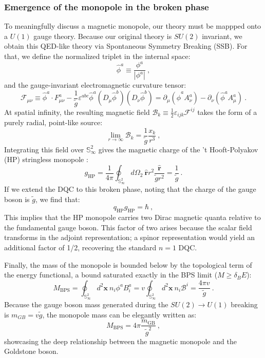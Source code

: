 \documentclass[a4paper,11pt]{article}
\begin{document}
\subsubsection{Emergence of the monopole in the broken phase}
To meaningfully discuss a magnetic monopole, our theory must be mappped onto a $U(1)$ gauge theory. Because our original theory is $SU(2)$ invariant, we obtain this QED-like theory via Spontaneous Symmetry Breaking (SSB). For that, we define the normalized triplet in the internal space:
\begin{equation}
    \hat \phi^a\equiv \frac{\phi^a}{|\phi^a|}\ ,
\end{equation}
and the gauge-invariant electromagnetic curvature tensor:
\begin{equation}
    \mathcal F_{\mu\nu}\equiv \hat \phi^a\cdot F^a_{\mu\nu}-\frac{1}{\tilde g}\varepsilon^{abc}\hat \phi^a(D_\mu \hat \phi^b)(D_\nu \hat \phi ^b)=\partial_\mu(\hat\phi^a A^a_\nu)-\partial_\nu (\hat \phi^a A^a_\mu)\ .
\end{equation}
At spatial infinity, the resulting magnetic field $\mathcal{B}_{k}\equiv\frac{1}{2}\varepsilon_{ijk}\mathcal{F}^{ij}$ takes the form of a purely radial, point-like source:
\begin{equation}
    \lim_{r\to \infty} \mathcal B_k=\frac{1}{\tilde g}\frac{x_k}{r^3}\ ,
\end{equation}
Integrating this field over $\mathbb{S}_{\infty}^{2}$ gives the magnetic charge of the 't Hooft-Polyakov (HP) stringless monopole \cite{tHooft1974,Polyakov1974}:
\begin{equation}
    g_{\text{HP}}=\frac{1}{4\pi}\oint_{\mathbb S^2_\infty}d\Omega_2\ \boldsymbol{\hat r}r^2 \frac{\boldsymbol{\hat r}}{\tilde g r^2}=\frac{1}{\tilde g}\ .
\end{equation}
If we extend the DQC to this broken phase, noting that the charge of the gauge boson is $\tilde{g}$, we find that:
\begin{equation}
    q_{\text{HP}}g_{\text{HP}}=\hbar\ ,
\end{equation}
This implies that the HP monopole carries two Dirac magnetic quanta relative to the fundamental gauge boson. This factor of two arises because the scalar field transforms in the adjoint representation; a spinor representation would yield an additional factor of 1/2, recovering the standard $n=1$ DQC.

Finally, the mass of the monopole is bounded below by the topological term of the energy functional, a bound saturated exactly in the BPS limit ($M \ge \delta_{B}E$):
\begin{equation}
    M_{\text{BPS}}=\oint_{\mathbb S^2_\infty}d^2 \boldsymbol x\ n_i \phi^a B_i^a=v\oint_{\mathbb S^2_\infty}d^2\boldsymbol x \ n_i \mathcal B^i=\frac{4\pi v}{\tilde g}\ .
\end{equation}
Because the gauge boson mass generated during the $SU(2)\rightarrow U(1)$ breaking is $m_{GB}=v\tilde{g}$, the monopole mass can be elegantly written as:
\begin{equation}
    M_{\text{BPS}}=4\pi \frac{m_{\text{GB}}}{\tilde g^2}\ ,
\end{equation}
showcasing the deep relationship between the magnetic monopole and the Goldstone boson.
\end{document}
